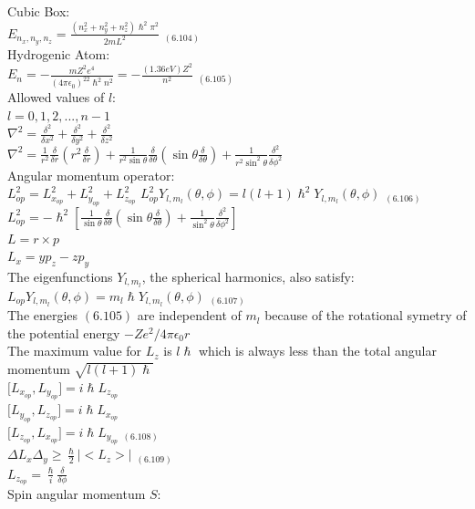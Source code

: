 \documentclass[0pt]{report}
\begin{document}
\begin{multicols*}{3}
\begin{flushleft}
Cubic Box:\\
$E_{n_x,n_y,n_z}=\frac{(n_x^2+n_y^2+n_z^2)\hslash^2\pi^2}{2mL^2}$ $_{(6.104)}$\\
Hydrogenic Atom:\\
$E_n=-\frac{mZ^2e^4}{(4\pi\epsilon_0)^22\hslash^2n^2}=-\frac{(1.36eV)Z^2}{n^2}$ $_{(6.105)}$\\
Allowed values of $l$:\\
$l=0,1,2,...,n-1$\\
$\nabla^2=\frac{\delta^2}{\delta x^2}+\frac{\delta^2}{\delta y^2}+\frac{\delta^2}{\delta z^2}$\\
$\nabla^2=\frac{1}{r^2}\frac{\delta}{\delta r}(r^2\frac{\delta}{\delta r})+\frac{1}{r^2\sin\theta}\frac{\delta}{\delta\theta}(\sin\theta\frac{\delta}{\delta\theta})+\frac{1}{r^2\sin^2\theta}\frac{\delta^2}{\delta\phi^2}$\\
Angular momentum operator:\\
$L^2_{op}=L^2_{x_{op}}+L^2_{y_{op}}+L^2_{z_{op}}$
$L^2_{op}Y_{l,m_l}(\theta,\phi)=l(l+1)\hslash^2Y_{l,m_l}(\theta,\phi)$ $_{(6.106)}$\\
$L^2_{op}=-\hslash^2[\frac{1}{\sin\theta}\frac{\delta}{\delta\theta}(\sin\theta\frac{\delta}{\delta\theta})+\frac{1}{\sin^2\theta}\frac{\delta^2}{\delta\phi^2}]$\\
$L=r\times p$\\
$L_x=yp_z-zp_y$\\
The eigenfunctions $Y_{l,m_l}$, the spherical harmonics, also satisfy:\\
$L_{op}Y_{l,m_l}(\theta,\phi)=m_l\hslash Y_{l,m_l}(\theta,\phi)$ $_{(6.107)}$\\
The energies $(6.105)$ are independent of $m_l$ because of the rotational symetry of the potential energy $-Ze^2/4\pi\epsilon_0 r$\\
The maximum value for $L_z$ is $l\hslash$ which is always less than the total angular momentum $\sqrt{l(l+1)\hslash}$\\
$\big[L_{x_{op}},L_{y_{op}}\big]=i\hslash L_{z_{op}}$\\
$\big[L_{y_{op}},L_{z_{op}}\big]=i\hslash L_{x_{op}}$\\
$\big[L_{z_{op}},L_{x_{op}}\big]=i\hslash L_{y_{op}}$ $_{(6.108)}$\\
$\Delta L_x\Delta_y\geq\frac{\hslash}{2}|\big<L_z\big>|$ $_{(6.109)}$\\
$L_{z_{op}}=\frac{\hslash}{i}\frac{\delta}{\delta\phi}$\\
Spin angular momentum $S$:\\

\end{flushleft}
\end{multicols*}
\end{document}
